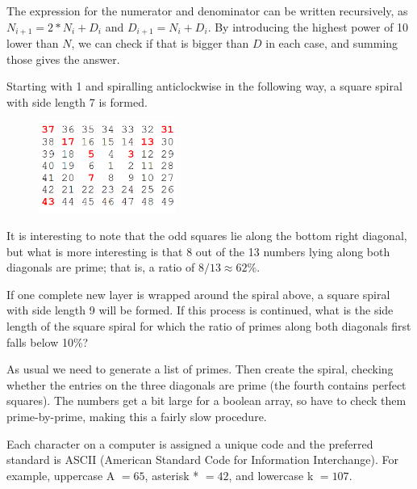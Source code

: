 The expression for the numerator and denominator can be written recursively, as
$N_{i+1} = 2*N_i+D_i$ and $D_{i+1} = N_i+D_i$.  By introducing the highest power of 10 lower than
$N$, we can check if that is bigger than $D$ in each case, and summing those gives the answer.




Starting with 1 and spiralling anticlockwise in the following way, a square spiral with side length 7 is formed.
\begin{center}
\begin{figure}[h]
\centering
\includegraphics[width = 0.40\textwidth]{./images/p_058.png}
\end{figure}
\end{center}
\vspace{-1cm}
It is interesting to note that the odd squares lie along the bottom right diagonal, but what is more interesting is that 8 out of the 13 numbers lying along both diagonals are prime; that is, a ratio of $8/13 \approx 62\%$.

If one complete new layer is wrapped around the spiral above, a square spiral with side length 9 will be formed. If this process is continued, what is the side length of the square spiral for which the ratio of primes along both diagonals first falls below 10\%?

As usual we need to generate a list of primes.  Then create the spiral, checking whether the entries on the three diagonals are prime (the fourth contains perfect squares).  The numbers get a bit large for a boolean array, so have to check them prime-by-prime, making this a fairly slow procedure.




Each character on a computer is assigned a unique code and the preferred standard is ASCII (American Standard Code for Information Interchange). For example, uppercase A $ = 65$, asterisk * $ = 42$, and lowercase k $ = 107$.

